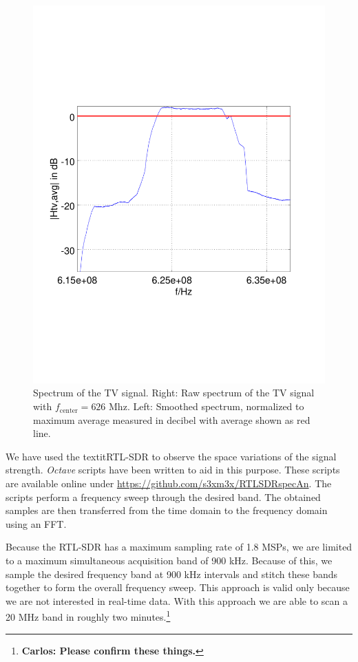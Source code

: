 \documentclass[conference]{IEEEtran}
\newcommand{\cp}[1]{\footnote{{\bf Carlos: #1}}}
\begin{document}
\begin{figure}[h]
\begin{minipage}{0.49\columnwidth}
	\includegraphics[width=\columnwidth]{./fig/626mhz_filtered}
	\end{minipage}
	\caption{Spectrum of the TV signal. Right: Raw spectrum of the TV signal with \ensuremath{f_{\text{center}}=\text{626 Mhz}}. Left: Smoothed spectrum, normalized to maximum average measured in decibel with average shown as red line.}
	\label{fig:tv_record} 
\end{figure}

We have used the textit{RTL-SDR} to observe the space variations of the signal strength. \textit{Octave} scripts have been written to aid in this purpose. These scripts are available online under \url{https://github.com/s3xm3x/RTLSDRspecAn}. The scripts perform a frequency sweep through the desired band. The obtained samples are then transferred from the time domain to the frequency domain using an FFT. 

Because the RTL-SDR has a maximum sampling rate of 1.8 MSPs, we are
limited to a maximum simultaneous acquisition band of 900 kHz. Because
of this, we sample the desired frequency band at 900 kHz intervals and
stitch these bands together to form the overall frequency sweep. This
approach is valid only because we are not interested in real-time data.
With this approach we are able to scan a 20 MHz band in roughly two
minutes.\cp{Please confirm these things.}
\end{document}
